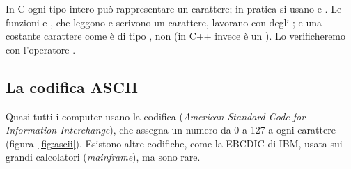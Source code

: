 In C ogni tipo intero può rappresentare un carattere; in pratica si usano
 e . Le funzioni  e , che
leggono e scrivono un carattere, lavorano con degli ; e una
costante carattere come  è di tipo , non 
(in C++ invece è un ). Lo verificheremo con l'operatore
.

\subsection{La codifica ASCII}

Quasi tutti i computer usano la codifica  (\textit{American
Standard Code for Information Interchange}), che assegna un numero da 0 a 127
a ogni carattere (figura~\ref{fig:ascii}). Esistono altre codifiche, come la
EBCDIC di IBM, usata sui grandi calcolatori (\textit{mainframe}), ma sono rare.

\newcommand{\asc}[4]{%
  \node[acella, #3] at (#1*2.2, -#2*0.4) {};
  \pgfmathtruncatemacro{\ascn}{#1*16+#2}%
  \node[anum] at (#1*2.2-0.22, -#2*0.4) {\ascn};
  \node[acar] at (#1*2.2+0.42, -#2*0.4) {#4};}
\newcommand{\ascesc}[1]{{\color{accent!75!black}\textbackslash #1}}
\newcommand{\ascnome}[1]{{\fontsize{5}{6}\selectfont\color{neutral!45!black}#1}}

